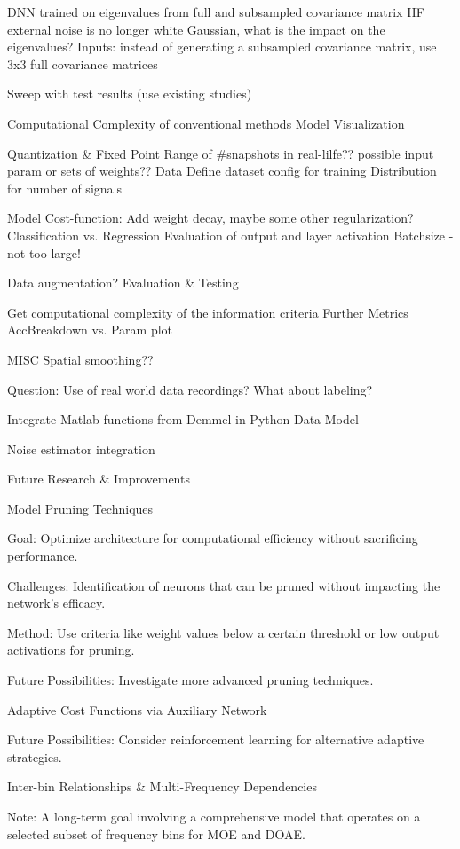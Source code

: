
DNN trained on eigenvalues from full and subsampled covariance matrix
HF external noise is no longer white Gaussian, what is the impact on the eigenvalues?
Inputs: instead of generating a subsampled covariance matrix, use 3x3 full covariance matrices

Sweep with test results (use existing studies)

Computational Complexity of conventional methods
Model Visualization


Quantization \& Fixed Point
Range of \#snapshots in real-lilfe?? possible input param or sets of weights??
Data
Define dataset config for training
Distribution for number of signals


Model
Cost-function: Add weight decay, maybe some other regularization?
Classification vs. Regression
Evaluation of output and layer activation
Batchsize - not too large!

Data augmentation?
Evaluation \& Testing

Get computational complexity of the information criteria
Further Metrics
AccBreakdown vs. Param plot

MISC
Spatial smoothing??

Question: Use of real world data recordings? What about labeling?

Integrate Matlab functions from Demmel in Python Data Model

Noise estimator integration



Future Research \& Improvements


Model Pruning Techniques

Goal: Optimize architecture for computational efficiency without sacrificing performance.

Challenges: Identification of neurons that can be pruned without impacting the network's efficacy.

Method: Use criteria like weight values below a certain threshold or low output activations for pruning.

Future Possibilities: Investigate more advanced pruning techniques.

Adaptive Cost Functions via Auxiliary Network



Future Possibilities: Consider reinforcement learning for alternative adaptive strategies.

Inter-bin Relationships \& Multi-Frequency Dependencies

Note: A long-term goal involving a comprehensive model that operates on a selected subset of frequency bins for MOE and DOAE.

